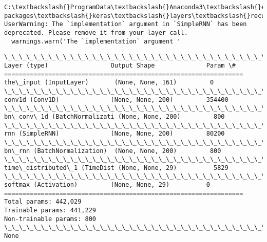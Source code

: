\documentclass[11pt]{article}
\begin{document}
    \begin{Verbatim}[commandchars=\\\{\}]
C:\textbackslash{}ProgramData\textbackslash{}Anaconda3\textbackslash{}envs\textbackslash{}nbkeras\textbackslash{}lib\textbackslash{}site-packages\textbackslash{}keras\textbackslash{}layers\textbackslash{}recurrent.py:1028: UserWarning: The `implementation` argument in `SimpleRNN` has been deprecated. Please remove it from your layer call.
  warnings.warn('The `implementation` argument '

    \end{Verbatim}

    \begin{Verbatim}[commandchars=\\\{\}]
\_\_\_\_\_\_\_\_\_\_\_\_\_\_\_\_\_\_\_\_\_\_\_\_\_\_\_\_\_\_\_\_\_\_\_\_\_\_\_\_\_\_\_\_\_\_\_\_\_\_\_\_\_\_\_\_\_\_\_\_\_\_\_\_\_
Layer (type)                 Output Shape              Param \#   
=================================================================
the\_input (InputLayer)       (None, None, 161)         0         
\_\_\_\_\_\_\_\_\_\_\_\_\_\_\_\_\_\_\_\_\_\_\_\_\_\_\_\_\_\_\_\_\_\_\_\_\_\_\_\_\_\_\_\_\_\_\_\_\_\_\_\_\_\_\_\_\_\_\_\_\_\_\_\_\_
conv1d (Conv1D)              (None, None, 200)         354400    
\_\_\_\_\_\_\_\_\_\_\_\_\_\_\_\_\_\_\_\_\_\_\_\_\_\_\_\_\_\_\_\_\_\_\_\_\_\_\_\_\_\_\_\_\_\_\_\_\_\_\_\_\_\_\_\_\_\_\_\_\_\_\_\_\_
bn\_conv\_1d (BatchNormalizati (None, None, 200)         800       
\_\_\_\_\_\_\_\_\_\_\_\_\_\_\_\_\_\_\_\_\_\_\_\_\_\_\_\_\_\_\_\_\_\_\_\_\_\_\_\_\_\_\_\_\_\_\_\_\_\_\_\_\_\_\_\_\_\_\_\_\_\_\_\_\_
rnn (SimpleRNN)              (None, None, 200)         80200     
\_\_\_\_\_\_\_\_\_\_\_\_\_\_\_\_\_\_\_\_\_\_\_\_\_\_\_\_\_\_\_\_\_\_\_\_\_\_\_\_\_\_\_\_\_\_\_\_\_\_\_\_\_\_\_\_\_\_\_\_\_\_\_\_\_
bn\_rnn (BatchNormalization)  (None, None, 200)         800       
\_\_\_\_\_\_\_\_\_\_\_\_\_\_\_\_\_\_\_\_\_\_\_\_\_\_\_\_\_\_\_\_\_\_\_\_\_\_\_\_\_\_\_\_\_\_\_\_\_\_\_\_\_\_\_\_\_\_\_\_\_\_\_\_\_
time\_distributed\_1 (TimeDist (None, None, 29)          5829      
\_\_\_\_\_\_\_\_\_\_\_\_\_\_\_\_\_\_\_\_\_\_\_\_\_\_\_\_\_\_\_\_\_\_\_\_\_\_\_\_\_\_\_\_\_\_\_\_\_\_\_\_\_\_\_\_\_\_\_\_\_\_\_\_\_
softmax (Activation)         (None, None, 29)          0         
=================================================================
Total params: 442,029
Trainable params: 441,229
Non-trainable params: 800
\_\_\_\_\_\_\_\_\_\_\_\_\_\_\_\_\_\_\_\_\_\_\_\_\_\_\_\_\_\_\_\_\_\_\_\_\_\_\_\_\_\_\_\_\_\_\_\_\_\_\_\_\_\_\_\_\_\_\_\_\_\_\_\_\_
None

    \end{Verbatim}
\end{document}
